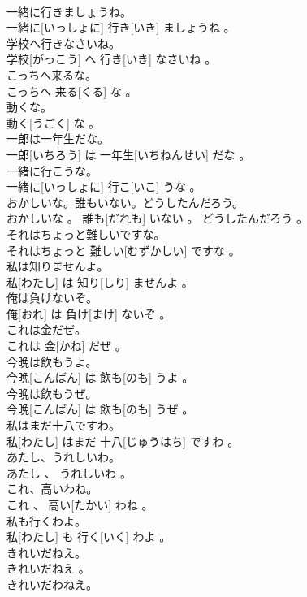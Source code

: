 \documentclass[8pt]{extreport}
\begin{document}
\begin{CJK}{UTF8}{min}
\\	一緒に行きましょうね。	
\\	一緒に[いっしょに] 行き[いき] ましょうね 。
\\	学校へ行きなさいね。	
\\	学校[がっこう] へ 行き[いき] なさいね 。
\\	こっちへ来るな。	
\\	こっちへ 来る[くる] な 。
\\	動くな。	
\\	動く[うごく] な 。
\\	一郎は一年生だな。	
\\	一郎[いちろう] は 一年生[いちねんせい] だな 。
\\	一緒に行こうな。	
\\	一緒に[いっしょに] 行こ[いこ] うな 。
\\	おかしいな。誰もいない。どうしたんだろう。	
\\	おかしいな 。 誰も[だれも] いない 。 どうしたんだろう 。
\\	それはちょっと難しいですな。	
\\	それはちょっと 難しい[むずかしい] ですな 。
\\	私は知りませんよ。	
\\	私[わたし] は 知り[しり] ませんよ 。
\\	俺は負けないぞ。	
\\	俺[おれ] は 負け[まけ] ないぞ 。
\\	これは金だぜ。	
\\	これは 金[かね] だぜ 。
\\	今晩は飲もうよ。	
\\	今晩[こんばん] は 飲も[のも] うよ 。
\\	今晩は飲もうぜ。	
\\	今晩[こんばん] は 飲も[のも] うぜ 。
\\	私はまだ十八ですわ。	
\\	私[わたし] はまだ 十八[じゅうはち] ですわ 。
\\	あたし、うれしいわ。	
\\	あたし 、 うれしいわ 。
\\	これ、高いわね。	
\\	これ 、 高い[たかい] わね 。
\\	私も行くわよ。	
\\	私[わたし] も 行く[いく] わよ 。
\\	きれいだねえ。	
\\	きれいだねえ 。
\\	きれいだわねえ。	

\end{CJK}
\end{document}
